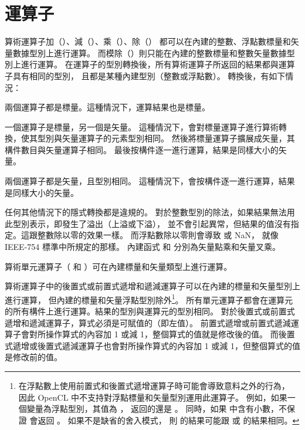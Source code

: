 \section{運算子}

\startigBig
\startitem
算術運算子加（\ccmm{+}）、減（\ccmm{-}）、乘（\ccmm{*}）、除（\ccmm{/}）
都可以在內建的整數、浮點數標量和矢量數據型別上進行運算。
而模除（\ccmm{\%}）則只能在內建的整數標量和整數矢量數據型別上進行運算。
在運算子的型別轉換後，所有算術運算子所返回的結果都與運算子具有相同的型別，
且都是某種內建型別（整數或浮點數）。
轉換後，有如下情況：
\startigBase
\item 兩個運算子都是標量。這種情況下，運算結果也是標量。

\item 一個運算子是標量，另一個是矢量。
這種情況下，會對標量運算子進行算術轉換，使其型別與矢量運算子的元素型別相同。
然後將標量運算子擴展成矢量，其構件數目與矢量運算子相同。
最後按構件逐一進行運算，結果是同樣大小的矢量。

\item 兩個運算子都是矢量，且型別相同。
這種情況下，會按構件逐一進行運算，結果是同樣大小的矢量。
\stopigBase

任何其他情況下的隱式轉換都是違規的。
對於整數型別的除法，如果結果無法用此型別表示，即發生了溢出（上溢或下溢），
並不會引起異常，但結果的值沒有指定。這跟整數除以零的效果一樣。
而浮點數除以零則會導致 \math{\pm\infty} 或 NaN，
就像 IEEE-754 標準中所規定的那樣。
內建函式  和  分別為矢量點乘和矢量叉乘。
\stopitem

\item 算術單元運算子（\ccmm{+} 和 \ccmm{-}）可在內建標量和矢量類型上進行運算。

\item 算術運算子中的後置式或前置式遞增和遞減運算子可以在內建的標量和矢量型別上進行運算，
但內建的標量和矢量浮點型別除外\footnote{
在浮點數上使用前置式和後置式遞增運算子時可能會導致意料之外的行為，
因此 OpenCL 中不支持對浮點標量和矢量型別運用此運算子。
例如，如果一個變量為浮點型別，其值為 ，
  返回的還是 。
同時，如果  中含有小數，不保證  會返回 。
如果不是缺省的舍入模式，
則  的結果可能跟  或  的結果相同。}。
所有單元運算子都會在運算元的所有構件上進行運算。結果的型別與運算元的型別相同。
對於後置式或前置式遞增和遞減運算子，算式必須是可賦值的（即左值）。
前置式遞增或前置式遞減運算子會對所操作算式的內容加 1 或減 1，整個算式的值就是修改後的值。
而後置式遞增或後置式遞減運算子也會對所操作算式的內容加 1 或減 1，但整個算式的值是修改前的值。

